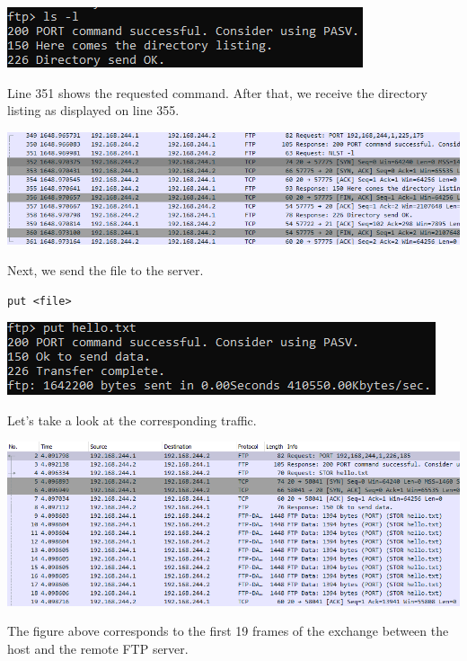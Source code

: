 \documentclass[12pt]{extarticle}
\begin{document}
\begin{center}
\includegraphics[scale=0.8]{resources/5-1-3.png}
\end{center}
Line 351 shows the requested command. After that, we receive the directory listing as displayed on line 355.
\begin{center}
\includegraphics[scale=0.6]{resources/5-1-4.png}
\end{center}
Next, we send the file to the server.
\begin{verbatim}
put <file>
\end{verbatim}
\begin{center}
\includegraphics[scale=0.8]{resources/5-2-2.png}
\end{center}
Let's take a look at the corresponding traffic.
\begin{center}
\includegraphics[scale=0.6]{resources/5-2-1.png}
\end{center}
The figure above corresponds to the first 19 frames of the exchange between the host and the remote FTP server.\\
\end{document}
